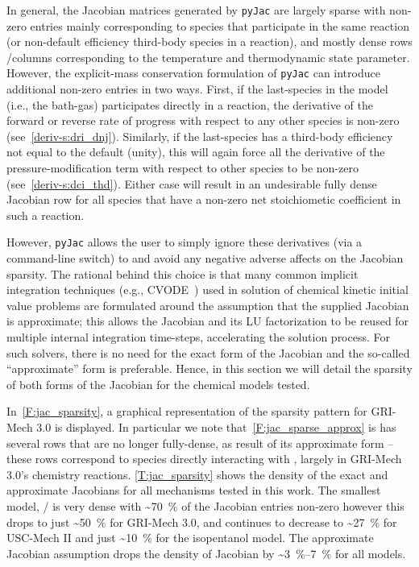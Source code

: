 \documentclass[12pt,number,sort&compress,preprint]{elsarticle}
\begin{document}
In general, the Jacobian matrices generated by \texttt{pyJac} are largely sparse with non-zero entries mainly corresponding to species that participate in the same reaction (or non-default efficiency third-body species in a reaction), and mostly dense rows \slash columns corresponding to the temperature and thermodynamic state parameter.
However, the explicit-mass conservation formulation of \texttt{pyJac} can introduce additional non-zero entries in two ways.
First, if the last-species in the model (i.e., the bath-gas) participates directly in a reaction, the derivative of the forward or reverse rate of progress with respect to any other species is non-zero (see~\cref{deriv-s:dri_dnj}).
Similarly, if the last-species has a third-body efficiency not equal to the default (unity), this will again force all the derivative of the pressure-modification term with respect to other species to be non-zero (see~\cref{deriv-s:dci_thd}).
Either case will result in an undesirable fully dense Jacobian row for all species that have a non-zero net stoichiometic coefficient in such a reaction.

However, \texttt{pyJac} allows the user to simply ignore these derivatives (via a command-line switch) to and avoid any negative adverse affects on the Jacobian sparsity.
The rational behind this choice is that many common implicit integration techniques (e.g., CVODE~\cite{cvode:2.8.2}) used in solution of chemical kinetic initial value problems are formulated around the assumption that the supplied Jacobian is approximate; this allows the Jacobian and its LU factorization to be reused for multiple internal integration time-steps, accelerating the solution process.
For such solvers, there is no need for the exact form of the Jacobian and the so-called ``approximate'' form is preferable.
Hence, in this section we will detail the sparsity of both forms of the Jacobian for the chemical models tested.

In~\cref{F:jac_sparsity}, a graphical representation of the sparsity pattern for GRI-Mech 3.0 is displayed.
In particular we note that~\cref{F:jac_sparse_approx} is has several rows that are no longer fully-dense, as result of its approximate form -- these rows correspond to species directly interacting with , largely in GRI-Mech 3.0's  chemistry reactions.
\cref{T:jac_sparsity} shows the density of the exact and approximate Jacobians for all mechanisms tested in this work.
The smallest model, \slash{} is very dense with \textasciitilde\SI{70}{\percent} of the Jacobian entries non-zero however this drops to just \textasciitilde\SI{50}{\percent} for GRI-Mech 3.0, and continues to decrease to \textasciitilde\SI{27}{\percent} for USC-Mech II and just \textasciitilde\SI{10}{\percent} for the isopentanol model.
The approximate Jacobian assumption drops the density of Jacobian by \textasciitilde\SIrange{3}{7}{\percent} for all models.
\end{document}
